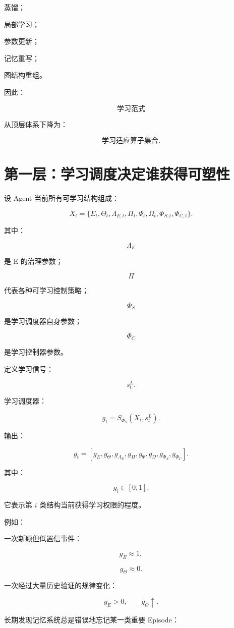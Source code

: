 蒸馏；

局部学习；

参数更新；

记忆重写；

图结构重组。

因此：

\[
\boxed{
\text{学习范式}
}
\]

从顶层体系下降为：

\[
\boxed{
\text{学习适应算子集合}.
}
\]


\section{第一层：学习调度决定谁获得可塑性}

设 Agent 当前所有可学习结构组成：

\[
\boxed{
X_t
=
\{
E_t,
\Theta_t,
\Lambda_{E,t},
\Pi_t,
\Psi_t,
\Omega_t,
\Phi_{S,t},
\Phi_{C,t}
\}.
}
\]

其中：

\[
\Lambda_E
\]

是 E 的治理参数；

\[
\Pi
\]

代表各种可学习控制策略；

\[
\Phi_S
\]

是学习调度器自身参数；

\[
\Phi_C
\]

是学习控制器参数。

定义学习信号：

\[
s_t^L.
\]

学习调度器：

\[
\boxed{
g_t
=
S_{\Phi_S}
(
X_t,
s_t^L
).
}
\]

输出：

\[
g_t
=
[
g_E,
g_\Theta,
g_{\Lambda_E},
g_{\Pi},
g_\Psi,
g_\Omega,
g_{\Phi_S},
g_{\Phi_C}
].
\]

其中：

\[
g_i\in[0,1].
\]

它表示第 \(i\) 类结构当前获得学习权限的程度。

例如：

一次新颖但低置信事件：

\[
g_E\approx1,
\]

\[
g_\Theta\approx0.
\]

一次经过大量历史验证的规律变化：

\[
g_E>0,
\qquad
g_\Theta\uparrow.
\]

长期发现记忆系统总是错误地忘记某一类重要 Episode：

